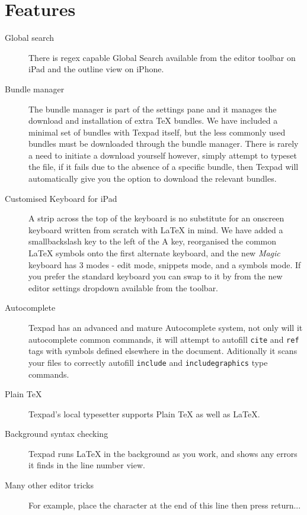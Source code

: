 \documentclass[11pt]{article}
\begin{document}
\section{Features}
  \begin{description}
    \item[Global search] There is regex capable Global Search available from the editor toolbar on iPad and the outline view on iPhone.
    \item[Bundle manager] The bundle manager is part of the settings pane and it manages the download and installation of extra TeX bundles.  We have included a minimal set of bundles with Texpad itself, but the less commonly used bundles must be downloaded through the bundle manager.  There is rarely a need to initiate a download yourself however, simply attempt to typeset the file, if it fails due to the absence of a specific bundle, then Texpad will automatically give you the option to download the relevant bundles.
    \item[Customised Keyboard for iPad] A strip across the top of the keyboard is no substitute for an onscreen keyboard written from scratch with LaTeX in mind.  We have added a smallbackslash key to the left of the A key, reorganised the common LaTeX symbols onto the first alternate keyboard, and the new \textit{Magic} keyboard has 3 modes - edit mode, snippets mode, and a symbols mode.  If you prefer the standard keyboard you can swap to it by from the new editor settings dropdown available from the toolbar.
    \item[Autocomplete] Texpad has an advanced and mature Autocomplete system, not only will it autocomplete common commands, it will attempt to autofill \texttt{cite} and \texttt{ref} tags with symbols defined elsewhere in the document.  Aditionally it scans your files to correctly autofill \texttt{include} and \texttt{includegraphics} type commands.
    \item[Plain TeX] Texpad's local typesetter supports Plain TeX as well as LaTeX.
    \item[Background syntax checking] Texpad runs LaTeX in the background as you work, and shows any errors it finds in the line number view.
    \item[Many other editor tricks] For example, place the character at the end of this line then press return...
  \end{description}
\end{document}
